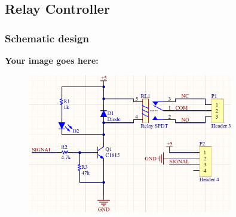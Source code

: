 \subsection{Relay Controller}
\subsubsection{Schematic design}
\textbf{Your image goes here:}
\begin{figure}[h!]
    \centering
    \includegraphics[width=0.8\textwidth]{graphics/ex2/f6.png}
\end{figure}

